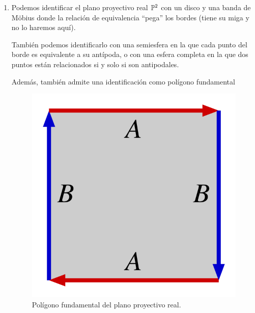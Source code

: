 \begin{exa}
\begin{enumerate}
		\item Podemos identificar el plano proyectivo real $\mathbb{P}^2$ con un disco y una banda de Möbius donde la relación de equivalencia ``pega'' los bordes (tiene su miga y no lo haremos aquí).
		
		También podemos identificarlo con una semiesfera en la que cada punto del borde es equivalente a su antípoda, o con una esfera completa en la que dos puntos están relacionados si y solo si son antipodales.
		
		Además, también admite una identificación como polígono fundamental
		
		\begin{figure}[h!]
			\centering
			\includegraphics[scale = 0.1]{img/pol_fund_plano_proy}
			\caption{Polígono fundamental del plano proyectivo real.}
		\end{figure}
		

\end{enumerate}
\end{exa}
